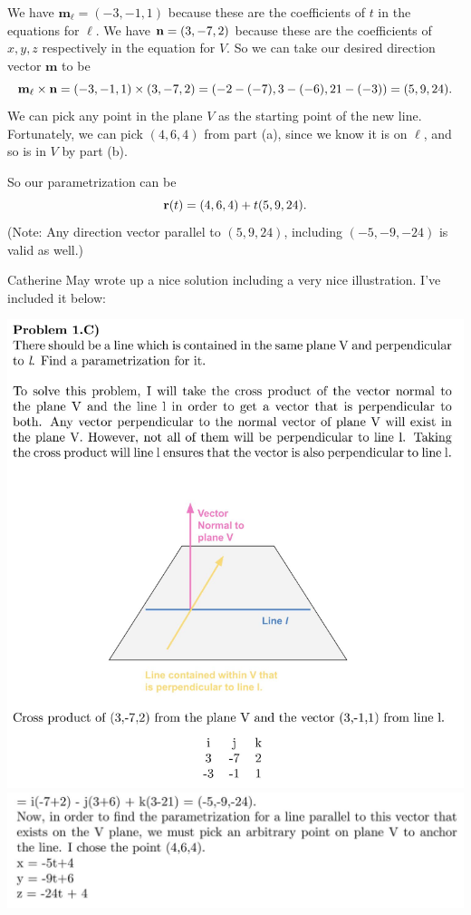 \begin{problem}
\begin{enumerate}[(a)]
\begin{solution}
      We have $\mathbf m_\ell=(-3,-1,1)$ because these are the coefficients of $t$ in the equations for $\ell$. We have $\mathbf n=(3,-7,2)$ because these are the coefficients of $x,y,z$ respectively in the equation for $V$. So we can take our desired direction vector $\mathbf m$ to be
      \[\mathbf m_\ell\times\mathbf n=(-3,-1,1)\times(3,-7,2)=(-2-(-7),3-(-6),21-(-3))=(5,9,24).\]
      We can pick any point in the plane $V$ as the starting point of the new line. Fortunately, we can pick $(4,6,4)$ from part (a), since we know it is on $\ell$, and so is in $V$ by part (b).

      So our parametrization can be
      \[\mathbf r(t)=(4,6,4)+t(5,9,24).\]
      (Note: Any direction vector parallel to $(5,9,24)$, including $(-5,-9,-24)$ is valid as well.)

      Catherine May wrote up a nice solution including a very nice illustration. I've included it below:
      \begin{center}
        \includegraphics[width=\textwidth]{nice/p2.1c_catherine.png}
        \includegraphics[width=\textwidth]{nice/p2.1c_catherine_page_2.png}

\end{center}
\end{solution}
\end{enumerate}
\end{problem}
